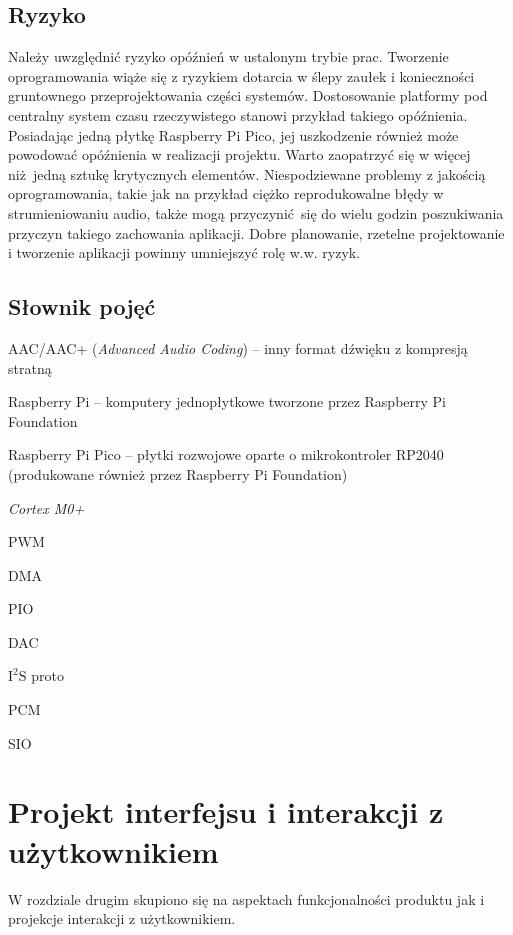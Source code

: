 \documentclass[12pt]{report}
\let\tempone\itemize
\let\temptwo\enditemize
\renewenvironment{itemize}{\tempone\setlength{\itemsep}{0cm}}{\temptwo}
\newcommand{\isqs}{$\text{I}^{2}\text{S}$}
\begin{document}
	\section{Ryzyko}
		Należy uwzględnić ryzyko opóźnień w ustalonym trybie prac. Tworzenie oprogramowania wiąże się z ryzykiem dotarcia w ślepy zaułek i konieczności gruntownego przeprojektowania części systemów. Dostosowanie platformy pod centralny system czasu rzeczywistego stanowi przykład takiego opóźnienia. Posiadając jedną płytkę Raspberry Pi Pico, jej uszkodzenie również może powodować opóźnienia w realizacji projektu. Warto zaopatrzyć się w więcej niż jedną sztukę krytycznych elementów. Niespodziewane problemy z jakością oprogramowania, takie jak na przykład ciężko reprodukowalne błędy w strumieniowaniu audio, także mogą przyczynić się do wielu godzin poszukiwania przyczyn takiego zachowania aplikacji.
		Dobre planowanie, rzetelne projektowanie i tworzenie aplikacji powinny umniejszyć rolę w.w. ryzyk.
	
	\section{Słownik pojęć}
		\begin{itemize}
			\item AAC/AAC+ (\textit{Advanced Audio Coding}) -- inny format dźwięku z kompresją stratną
			\item Raspberry Pi -- komputery jednopłytkowe tworzone przez Raspberry Pi Foundation
			\item Raspberry Pi Pico -- płytki rozwojowe oparte o mikrokontroler RP2040 (produkowane również przez Raspberry Pi Foundation)
			\item \textit{Cortex M0+}
			\item PWM
			\item DMA
			\item PIO
			\item DAC
			\item \isqs{} proto
			\item PCM
			\item SIO
		\end{itemize}
	
	\chapter{Projekt interfejsu i interakcji z użytkownikiem}
	W rozdziale drugim skupiono się na aspektach funkcjonalności produktu jak i projekcje interakcji z użytkownikiem.\\
	
\end{document}
